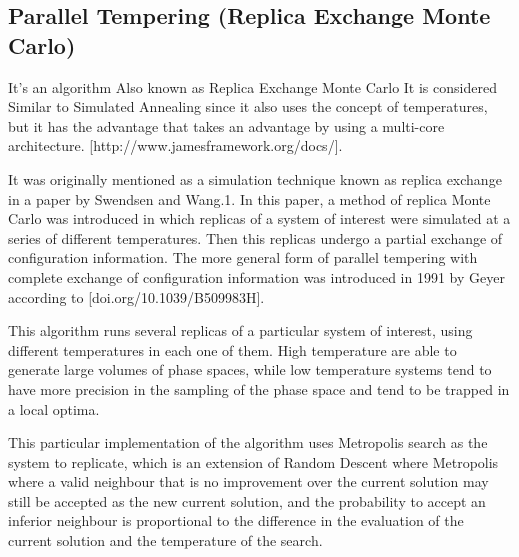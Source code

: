 \subsection{Parallel Tempering (Replica Exchange Monte Carlo)} 

It's an algorithm Also known as Replica Exchange Monte Carlo It is considered Similar to Simulated Annealing since it also uses the concept of temperatures, but it has the advantage that takes an advantage by using a multi-core architecture. [http://www.jamesframework.org/docs/].

It was originally mentioned as a simulation technique known as replica exchange in a paper by Swendsen and Wang.1. In this paper, a method of replica Monte Carlo was introduced in which replicas of a system of interest were simulated at a series of different temperatures. Then this replicas undergo a partial exchange of configuration information. The more general form of parallel tempering with complete exchange of configuration information was introduced in 1991 by Geyer according to [doi.org/10.1039/B509983H].

This algorithm runs several replicas of a particular system of interest, using different temperatures in each one of them. High temperature are able to generate large volumes of phase spaces, while low temperature systems tend to have more precision in the sampling of the phase space and tend to be trapped in a local optima.

This particular implementation of the algorithm uses Metropolis search as the system to replicate, which is an extension of Random Descent where Metropolis where a valid neighbour that is no improvement over the current solution may still be accepted as the new current solution, and the probability to accept an inferior neighbour is proportional to the difference in the evaluation of the current solution and the temperature of the search.

